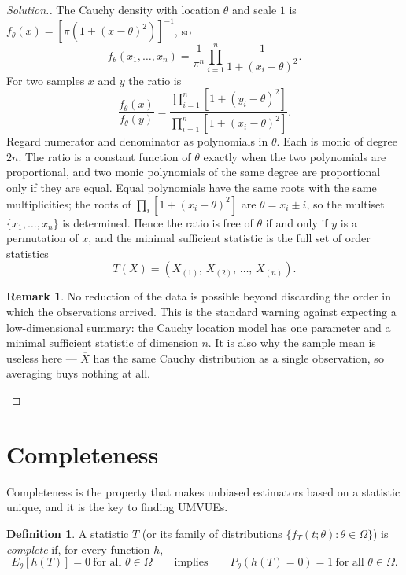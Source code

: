 \documentclass[12pt,a4paper]{report}
\theoremstyle{definition}
\newtheorem{defn}[thm]{Definition}
\newtheorem*{remark}{Remark}
\newenvironment{solution}
  {\renewcommand{\qedsymbol}{}\begin{proof}[\textit{Solution}.]}
  {\end{proof}}
\begin{document}
\begin{solution}
The Cauchy density with location $\theta$ and scale $1$ is
$f_{\theta}(x) = \left[\pi\left(1+(x-\theta)^{2}\right)\right]^{-1}$, so
\[f_{\theta}(x_1,\dots,x_n) = \frac{1}{\pi^{n}}\prod_{i=1}^{n}\frac{1}{1+(x_i-\theta)^{2}} .\]
For two samples $x$ and $y$ the ratio is
\[\frac{f_{\theta}(x)}{f_{\theta}(y)}
= \frac{\prod_{i=1}^{n}\left[1+(y_i-\theta)^{2}\right]}
       {\prod_{i=1}^{n}\left[1+(x_i-\theta)^{2}\right]} .\]
Regard numerator and denominator as polynomials in $\theta$. Each is monic of
degree $2n$. The ratio is a constant function of $\theta$ exactly when the two
polynomials are proportional, and two monic polynomials of the same degree are
proportional only if they are equal. Equal polynomials have the same roots with
the same multiplicities; the roots of $\prod_i\left[1+(x_i-\theta)^{2}\right]$
are $\theta = x_i \pm i$, so the multiset $\{x_1,\dots,x_n\}$ is determined.
Hence the ratio is free of $\theta$ if and only if $y$ is a permutation of $x$,
and the minimal sufficient statistic is the full set of order statistics
\[T(X) = \left(X_{(1)},\, X_{(2)},\, \dots,\, X_{(n)}\right).\]

\begin{remark}
No reduction of the data is possible beyond discarding the order in which the
observations arrived. This is the standard warning against expecting a
low-dimensional summary: the Cauchy location model has one parameter and a
minimal sufficient statistic of dimension $n$. It is also why the sample mean is
useless here --- $\overline{X}$ has the same Cauchy distribution as a single
observation, so averaging buys nothing at all.
\end{remark}
\end{solution}

\section{Completeness}

Completeness is the property that makes unbiased estimators based on a statistic
unique, and it is the key to finding UMVUEs.

\begin{defn}
\label{def:complete}
A statistic $T$ (or its family of distributions $\{f_T(t;\theta) : \theta\in\Omega\}$)
is \emph{complete} if, for every function $h$,
\[E_\theta\left[h(T)\right] = 0\ \text{for all } \theta\in\Omega
\qquad\text{implies}\qquad
P_\theta\left(h(T) = 0\right) = 1\ \text{for all } \theta\in\Omega .\]
\end{defn}
\end{document}
